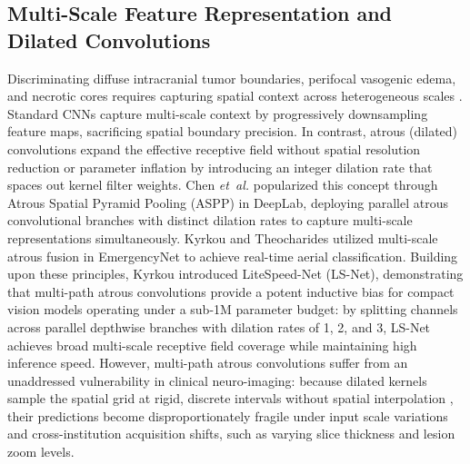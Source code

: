 \subsection{Multi-Scale Feature Representation and Dilated Convolutions}
Discriminating diffuse intracranial tumor boundaries, perifocal vasogenic edema, and necrotic cores requires capturing spatial context across heterogeneous scales \cite{2, 23, 39}. Standard CNNs capture multi-scale context by progressively downsampling feature maps, sacrificing spatial boundary precision. In contrast, atrous (dilated) convolutions \cite{5} expand the effective receptive field without spatial resolution reduction or parameter inflation by introducing an integer dilation rate that spaces out kernel filter weights. Chen \emph{et~al.} \cite{5} popularized this concept through Atrous Spatial Pyramid Pooling (ASPP) in DeepLab, deploying parallel atrous convolutional branches with distinct dilation rates to capture multi-scale representations simultaneously. Kyrkou and Theocharides \cite{17} utilized multi-scale atrous fusion in EmergencyNet to achieve real-time aerial classification. Building upon these principles, Kyrkou \cite{16} introduced LiteSpeed-Net (LS-Net), demonstrating that multi-path atrous convolutions provide a potent inductive bias for compact vision models operating under a sub-1M parameter budget: by splitting channels across parallel depthwise branches with dilation rates of 1, 2, and 3, LS-Net achieves broad multi-scale receptive field coverage while maintaining high inference speed. However, multi-path atrous convolutions suffer from an unaddressed vulnerability in clinical neuro-imaging: because dilated kernels sample the spatial grid at rigid, discrete intervals without spatial interpolation \cite{5, 16}, their predictions become disproportionately fragile under input scale variations and cross-institution acquisition shifts, such as varying slice thickness and lesion zoom levels.

